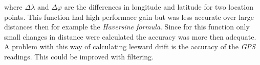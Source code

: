 where $\Delta\lambda$ and $\Delta\varphi$ are the differences in longitude and latitude for two location points. This function had high performace gain but was less accurate over large distances then for example the \textit{Haversine formula}\cite{haversine}. Since for this function only small changes in distance were calculated the accuracy was more then adequate. A problem with this way of calculating leeward drift is the accuracy of the \textit{GPS} readings. This could be improved with filtering.


























